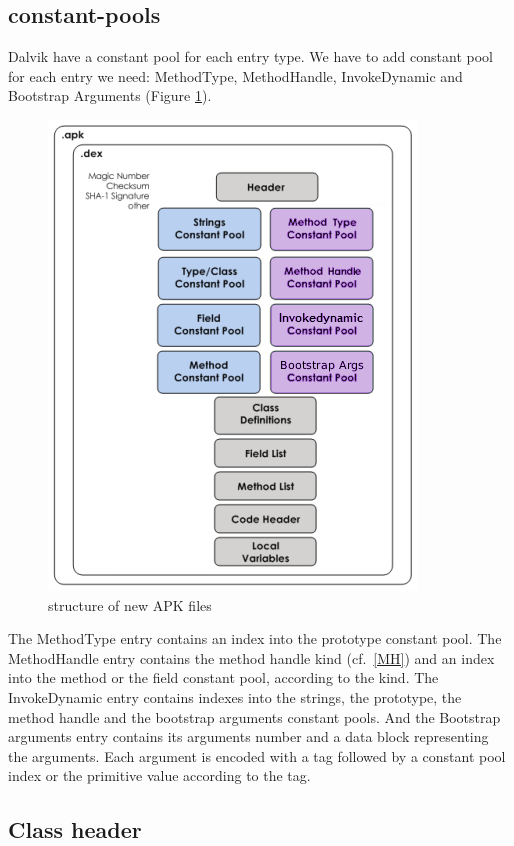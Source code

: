 \documentclass{sig-alternate}
\def \DALVIK{Dalvik\xspace}
\begin{document}
  \subsection{constant-pools}

    \DALVIK have a constant pool for each entry type.
    We have to add constant pool for each entry we need:
    MethodType, MethodHandle, InvokeDynamic and Bootstrap Arguments (Figure \ref{SNA}).

    \begin{figure}[!h]
      \centering \includegraphics[width=.5\columnwidth]{structure-apk-292.png}
      \caption{structure of new APK files}
      \label{SNA}
    \end{figure}

    The MethodType entry contains an index into the prototype constant pool.
    The MethodHandle entry contains the method handle kind (cf.~\ref{MH})
    and an index into the method or the field constant pool, according to the kind.
    The InvokeDynamic entry contains indexes into the strings, the prototype,
    the method handle and the bootstrap arguments constant pools.
    And the Bootstrap arguments entry contains its arguments number
    and a data block representing the arguments.
    Each argument is encoded with a tag
    followed by a constant pool index or the primitive value according to the tag.

    
    
    
    

  \subsection{Class header}
\end{document}
